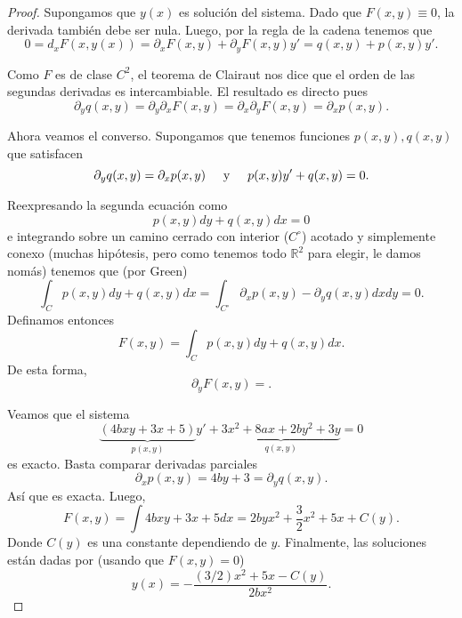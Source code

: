 \begin{proof}
Supongamos que \(y(x)\) es solución del sistema. Dado que \(F(x,y) \equiv 0\), la
derivada también debe ser nula. Luego, por la regla de la cadena tenemos que
\[
    0
    =
    d_x F(x,y(x))
    =
    \partial_x F(x,y) + \partial_y F(x,y) y'
    =
    q(x,y) + p(x,y) y'
.\]

Como \(F\) es de clase \(C^2\), el teorema de Clairaut nos dice que el orden de las
segundas derivadas es intercambiable. El resultado es directo pues
\[
    \partial_y q(x,y) = \partial_y \partial_x F(x,y)
    =
    \partial_x \partial_y F(x,y) = \partial_x p(x,y)
.\]

Ahora veamos el converso. Supongamos que tenemos funciones \(p(x,y), q(x,y)\) que
satisfacen
\[
    \partial_y q(x,y) = \partial_x p(x,y)
    \hspace{.5cm} \text{y} \hspace{.5cm}
    p(x,y)y' + q(x,y) = 0
.\]

Reexpresando la segunda ecuación como
\[
    p(x,y) dy + q(x,y) dx = 0
\]
e integrando sobre un camino cerrado con interior (\(C^{\circ}\)) acotado y
simplemente conexo (muchas hipótesis, pero como tenemos todo \(\mathbb{R}^2\)
para elegir, le damos nomás) tenemos que (por Green)
\[
    \int_{C} p(x,y) dy + q(x,y) dx
    =
    \int_{C^{\circ}} \partial_x p(x,y) - \partial_y q(x,y) dx dy
    =
    0
.\]
Definamos entonces
\[
    F(x,y)
    =
    \int_{C} p(x,y) dy  + q(x,y) dx
.\]
De esta forma,
\[
    \partial_y F(x,y)
    =
.\]

Veamos que el sistema
\[
    \underbrace{(4bxy + 3x + 5)}_{p(x,y)}y'
    +
    \underbrace{3x^2 + 8ax + 2by^2 + 3y}_{q(x,y)}
    = 0
\]
es exacto. Basta comparar derivadas parciales
\[
    \partial_x p(x,y) = 4by + 3 = \partial_y q(x,y)
.\]
Así que es exacta. Luego,
\[
    F(x,y) = \int 4bxy + 3x + 5 dx = 2byx^2 + \frac{3}{2} x^2 + 5x + C(y)
.\]
Donde \(C(y)\) es una constante dependiendo de \(y\). Finalmente, las soluciones
están dadas por (usando que \(F(x,y) = 0\))
\[
    y(x) = -\frac{(3/2)x^2 + 5x - C(y)}{2bx^2}
.\]

\end{proof}

